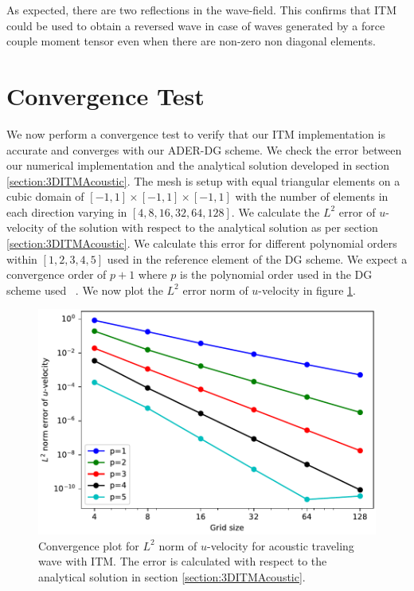 As expected, there are two reflections in the wave-field. This confirms that \ac{ITM} could be used to obtain a reversed wave in case of waves generated by a force couple moment tensor even when there are non-zero non diagonal elements.
\section{Convergence Test}\label{sec:convergence}
We now perform a convergence test to verify that our \ac{ITM} implementation is accurate and converges with our \ac{ADER}-\ac{DG} scheme. 
We check the error between our numerical implementation and the analytical solution developed in section \ref{section:3DITMAcoustic}. 
The mesh is setup with equal triangular elements on a cubic domain of $\left[-1, 1\right] \times \left[-1, 1\right] \times \left[-1, 1\right]$ with the number of elements in each direction varying in $\left[4, 8, 16, 32, 64, 128\right]$.
We calculate the $L^2$ error of $u$-velocity of the solution with respect to the analytical solution as per section \ref{section:3DITMAcoustic}. We calculate this error for different polynomial
orders within $\left[1, 2, 3, 4, 5\right]$ used in the reference element of the \ac{DG} scheme. We expect a convergence order of $p+1$ where $p$ is the polynomial order used in the
\ac{DG} scheme used ~\parencite{cockburn2011discontinuous}. We now plot the $L^2$ error norm of $u$-velocity in figure \ref{fig:convergence}.

\begin{figure}[htpb]
    \centering
    \includegraphics[width=0.8\linewidth]{figures/error1.pdf}
    \caption{Convergence plot for $L^2$ norm of $u$-velocity for acoustic traveling wave with \ac{ITM}. The error is calculated with respect to the analytical solution
    in section \ref{section:3DITMAcoustic}.}
    \label{fig:convergence}
\end{figure}

